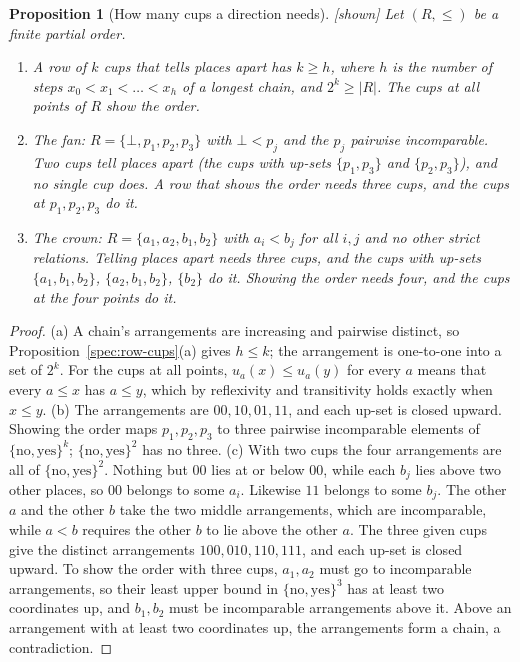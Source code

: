 \documentclass[11pt, a4paper]{article}
\theoremstyle{plain}
\newtheorem{proposition}[theorem]{Proposition}
\theoremstyle{definition}
\theoremstyle{remark}
\newcommand{\Bool}{\{\mathrm{no},\mathrm{yes}\}}
\newcommand{\kind}[1]{\textup{[#1]}}
\begin{document}
\begin{proposition}[How many cups a direction needs]\label{spec:how-many-cups} \kind{shown}
Let $(R,\le)$ be a finite partial order.
\begin{enumerate}[label=(\alph*)]
\item A row of $k$ cups that tells places apart has $k\ge h$, where $h$ is the number of steps
$x_0<x_1<\dots<x_h$ of a longest chain, and $2^k\ge|R|$. The cups at all points of $R$ show the order.
\item The fan: $R=\{\bot,p_1,p_2,p_3\}$ with $\bot<p_j$ and the $p_j$ pairwise incomparable. Two cups tell
places apart (the cups with up-sets $\{p_1,p_3\}$ and $\{p_2,p_3\}$), and no single cup does. A row that
shows the order needs three cups, and the cups at $p_1,p_2,p_3$ do it.
\item The crown: $R=\{a_1,a_2,b_1,b_2\}$ with $a_i<b_j$ for all $i,j$ and no other strict relations.
Telling places apart needs three cups, and the cups with up-sets $\{a_1,b_1,b_2\}$, $\{a_2,b_1,b_2\}$,
$\{b_2\}$ do it. Showing the order needs four, and the cups at the four points do it.
\end{enumerate}
\end{proposition}

\begin{proof}
(a) A chain's arrangements are increasing and pairwise distinct, so Proposition~\ref{spec:row-cups}(a)
gives $h\le k$; the arrangement is one-to-one into a set of $2^k$. For the cups at all points,
$u_a(x)\le u_a(y)$ for every $a$ means that every $a\le x$ has $a\le y$, which by reflexivity and
transitivity holds exactly when $x\le y$. (b) The arrangements are $00,10,01,11$, and each
up-set is closed upward. Showing the order maps $p_1,p_2,p_3$ to three pairwise incomparable elements of
$\Bool^k$; $\Bool^2$ has no three. (c) With two cups the four arrangements are all of $\Bool^2$. Nothing
but $00$ lies at or below $00$, while each $b_j$ lies above two other places, so $00$ belongs to some
$a_i$. Likewise $11$ belongs to some $b_j$. The other $a$ and the other $b$ take the two middle arrangements, which are incomparable, while
$a<b$ requires the other $b$ to lie above the other $a$. The three given cups give the distinct
arrangements $100,010,110,111$, and each up-set is closed upward. To show the order with three cups,
$a_1,a_2$ must go to incomparable arrangements, so their least upper bound in $\Bool^3$ has at least two
coordinates up, and $b_1,b_2$ must be incomparable arrangements above it. Above an arrangement with at
least two coordinates up, the arrangements form a chain, a contradiction.
\end{proof}
\end{document}
